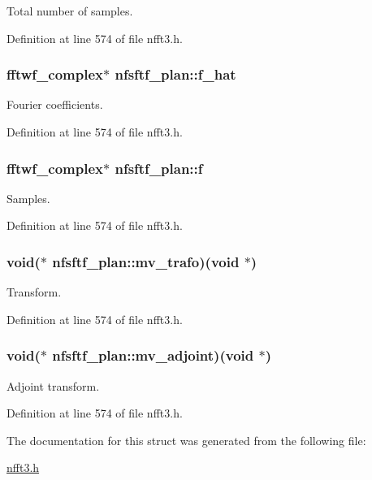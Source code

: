 Total number of samples. 



Definition at line 574 of file nfft3.\-h.

\hypertarget{structnfsftf__plan_a840547e30414a41c3751e2b418f76312}{
\subsubsection[{f\-\_\-hat}]{\setlength{\rightskip}{0pt plus 5cm}fftwf\-\_\-complex$\ast$ nfsftf\-\_\-plan\-::f\-\_\-hat}}\label{structnfsftf__plan_a840547e30414a41c3751e2b418f76312}


Fourier coefficients. 



Definition at line 574 of file nfft3.\-h.

\hypertarget{structnfsftf__plan_a7cfd191a4353a736bf9045c7e1d46f70}{
\subsubsection[{f}]{\setlength{\rightskip}{0pt plus 5cm}fftwf\-\_\-complex$\ast$ nfsftf\-\_\-plan\-::f}}\label{structnfsftf__plan_a7cfd191a4353a736bf9045c7e1d46f70}


Samples. 



Definition at line 574 of file nfft3.\-h.

\hypertarget{structnfsftf__plan_a417f0b7f48ab77d5af34ed1da9ba95c9}{
\subsubsection[{mv\-\_\-trafo}]{\setlength{\rightskip}{0pt plus 5cm}void($\ast$ nfsftf\-\_\-plan\-::mv\-\_\-trafo)(void $\ast$)}}\label{structnfsftf__plan_a417f0b7f48ab77d5af34ed1da9ba95c9}


Transform. 



Definition at line 574 of file nfft3.\-h.

\hypertarget{structnfsftf__plan_af4deec395e0a4650b1e108677b787900}{
\subsubsection[{mv\-\_\-adjoint}]{\setlength{\rightskip}{0pt plus 5cm}void($\ast$ nfsftf\-\_\-plan\-::mv\-\_\-adjoint)(void $\ast$)}}\label{structnfsftf__plan_af4deec395e0a4650b1e108677b787900}


Adjoint transform. 



Definition at line 574 of file nfft3.\-h.



The documentation for this struct was generated from the following file\-:\begin{DoxyCompactItemize}
\item 
\hyperlink{nfft3_8h}{nfft3.\-h}\end{DoxyCompactItemize}
